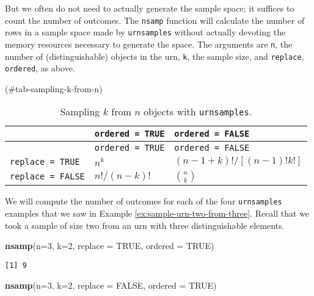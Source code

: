\documentclass[]{book}
\newenvironment{Shaded}{\begin{snugshade}}{\end{snugshade}}
\newcommand{\KeywordTok}[1]{\textcolor[rgb]{0.13,0.29,0.53}{\textbf{{#1}}}}
\newcommand{\DataTypeTok}[1]{\textcolor[rgb]{0.13,0.29,0.53}{{#1}}}
\newcommand{\DecValTok}[1]{\textcolor[rgb]{0.00,0.00,0.81}{{#1}}}
\newcommand{\OtherTok}[1]{\textcolor[rgb]{0.56,0.35,0.01}{{#1}}}
\newcommand{\NormalTok}[1]{{#1}}
\numberwithin{equation}{chapter}
\numberwithin{figure}{chapter}
\theoremstyle{plain}
\theoremstyle{definition}
\theoremstyle{remark}
\theoremstyle{definition}
\theoremstyle{definition}
\theoremstyle{remark}
\let\BeginKnitrBlock\begin \let\EndKnitrBlock\end
\begin{document}
But we often do not need to actually generate the sample space; it
suffices to count the number of outcomes. The \texttt{nsamp} function
will calculate the number of rows in a sample space made by
\texttt{urnsamples} without actually devoting the memory resources
necessary to generate the space. The arguments are \texttt{n}, the
number of (distinguishable) objects in the urn, \texttt{k}, the sample
size, and \texttt{replace}, \texttt{ordered}, as above.

(\#tab-sampling-k-from-n)

\begin{longtable}[]{@{}lll@{}}
\caption{Sampling \(k\) from \(n\) objects with
\texttt{urnsamples}.}\tabularnewline
\toprule
& \texttt{ordered\ =\ TRUE} & \texttt{ordered\ =\ FALSE}\tabularnewline
\midrule
\endfirsthead
\toprule
& \texttt{ordered\ =\ TRUE} & \texttt{ordered\ =\ FALSE}\tabularnewline
\midrule
\endhead
\texttt{replace\ =\ TRUE} & \(n^{k}\) &
\((n-1+k)! / [(n-1)!k!]\)\tabularnewline
\texttt{replace\ =\ FALSE} & \(n! / (n-k)!\) &
\({n \choose k}\)\tabularnewline
\bottomrule
\end{longtable}

\bigskip

\BeginKnitrBlock{example}
\protect\hypertarget{ex:unnamed-chunk-141}{}{\label{ex:unnamed-chunk-141}}We
will compute the number of outcomes for each of the four
\texttt{urnsamples} examples that we saw in Example
\ref{ex:sample-urn-two-from-three}. Recall that we took a sample of size
two from an urn with three distinguishable elements.
\EndKnitrBlock{example}

\begin{Shaded}
\begin{Highlighting}[]
\KeywordTok{nsamp}\NormalTok{(}\DataTypeTok{n=}\DecValTok{3}\NormalTok{, }\DataTypeTok{k=}\DecValTok{2}\NormalTok{, }\DataTypeTok{replace =} \OtherTok{TRUE}\NormalTok{, }\DataTypeTok{ordered =} \OtherTok{TRUE}\NormalTok{) }
\end{Highlighting}
\end{Shaded}

\begin{verbatim}
[1] 9
\end{verbatim}

\begin{Shaded}
\begin{Highlighting}[]
\KeywordTok{nsamp}\NormalTok{(}\DataTypeTok{n=}\DecValTok{3}\NormalTok{, }\DataTypeTok{k=}\DecValTok{2}\NormalTok{, }\DataTypeTok{replace =} \OtherTok{FALSE}\NormalTok{, }\DataTypeTok{ordered =} \OtherTok{TRUE}\NormalTok{) }
\end{Highlighting}
\end{Shaded}
\end{document}
